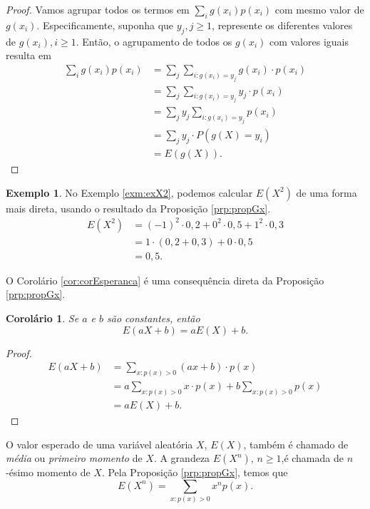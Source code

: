 \documentclass[]{book}
\newtheorem{corollary}{Corolário}[chapter]
\theoremstyle{definition}
\theoremstyle{definition}
\newtheorem{example}{Exemplo}[chapter]
\theoremstyle{definition}
\theoremstyle{remark}
\begin{document}
\begin{proof}
\iffalse{} {Prova. } \fi{}Vamos agrupar todos os termos em \(\sum_i g(x_i)p(x_i)\) com mesmo valor de \(g(x_i)\).
Especificamente, suponha que \(y_j, j\geq 1\), represente os diferentes valores de \(g(x_i), i\geq 1\).
Então, o agrupamento de todos os \(g(x_i)\) com valores iguais resulta em
\begin{align}
\sum_i g(x_i)p(x_i) &= \sum_j \sum_{i:g(x_i)=y_j} g(x_i)\cdot p(x_i)\\
&=\sum_j \sum_{i:g(x_i)=y_j} y_j\cdot p(x_i)\\
&=\sum_j y_j \sum_{i:g(x_i)=y_j} p(x_i)\\
&=\sum_j y_j \cdot P(g(X)=y_i)\\
&= E(g(X)).
\end{align}
\end{proof}

\begin{example}
\protect\hypertarget{exm:unnamed-chunk-174}{}{\label{exm:unnamed-chunk-174} }No Exemplo \ref{exm:exX2}, podemos calcular \(E(X^2)\) de uma forma mais direta, usando o resultado da Proposição \ref{prp:propGx}.
\begin{align}
E(X^2) &= (-1)^2\cdot 0{,}2 + 0^2\cdot 0{,}5 + 1^2\cdot 0{,}3\\
&= 1\cdot(0{,}2+0{,}3) + 0\cdot 0{,}5\\
&= 0{,}5.
\end{align}
\end{example}

O Corolário \ref{cor:corEsperanca} é uma consequência direta da Proposição \ref{prp:propGx}.

\begin{corollary}
\protect\hypertarget{cor:corEsperanca}{}{\label{cor:corEsperanca} }Se \(a\) e \(b\) são constantes, então \[E(aX+b) = aE(X)+b.\]
\end{corollary}

\begin{proof}
\iffalse{} {Prova. } \fi{}\begin{align}
E(aX+b) &= \sum_{x:p(x)>0}(ax+b)\cdot p(x)\\
&=a\sum_{x:p(x)>0}x \cdot p(x) + b\sum_{x:p(x)>0}p(x)\\
&= aE(X) + b.
\end{align}
\end{proof}

O valor esperado de uma variável aleatória \(X\), \(E(X)\), também é chamado de \emph{média} ou \emph{primeiro momento} de \(X\).
A grandeza \(E(X^n)\), \(n\geq 1\),é chamada de \(n\)-ésimo momento de \(X\).
Pela Proposição \ref{prp:propGx}, temos que
\[E(X^n) = \sum_{x:p(x)> 0}x^n p(x).\]
\end{document}
